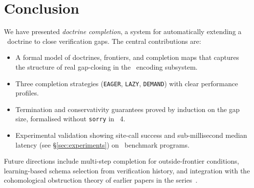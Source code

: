 \documentclass[11pt]{article}
\newcommand{\EAGER}{\texttt{EAGER}}
\newcommand{\LAZY}{\texttt{LAZY}}
\newcommand{\DEMAND}{\texttt{DEMAND}}
\begin{document}
\section{Conclusion}\label{sec:conclusion}

We have presented \emph{doctrine completion}, a system for
automatically extending a \JuGeo\ doctrine to close verification gaps.
The central contributions are:

\begin{itemize}[leftmargin=2em]
  \item A formal model of doctrines, frontiers, and completion maps
        that captures the structure of real gap-closing in the \JuGeo\
        encoding subsystem.
  \item Three completion strategies (\EAGER, \LAZY, \DEMAND) with
        clear performance profiles.
  \item Termination and conservativity guarantees proved by induction
        on the gap size, formalised without \texttt{sorry} in \LEAN{}~4.
  \item Experimental validation showing \subSiteSuccessRate{} site-call success and
        sub-millisecond median latency (see \S\ref{sec:experiments}) on \numcases\ benchmark programs.
\end{itemize}

Future directions include multi-step completion for outside-frontier
conditions, learning-based schema selection from verification history,
and integration with the cohomological obstruction theory of earlier
papers in the series~\cite{JuGeo03}.
\end{document}
